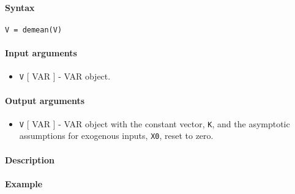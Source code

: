 


	\paragraph{Syntax}

\begin{verbatim}
V = demean(V)
\end{verbatim}

\paragraph{Input arguments}

\begin{itemize}
\itemsep1pt\parskip0pt
\item
  \texttt{V} {[} VAR {]} - VAR object.
\end{itemize}

\paragraph{Output arguments}

\begin{itemize}
\itemsep1pt\parskip0pt
\item
  \texttt{V} {[} VAR {]} - VAR object with the constant vector,
  \texttt{K}, and the asymptotic assumptions for exogenous inputs,
  \texttt{X0}, reset to zero.
\end{itemize}

\paragraph{Description}

\paragraph{Example}


